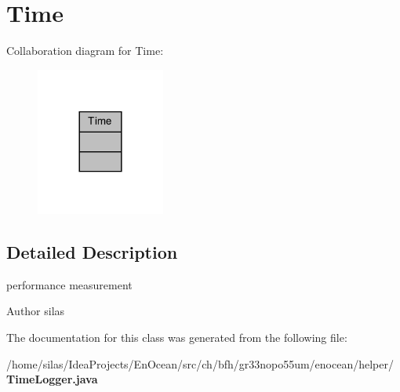 \section{Time}
\label{classTime}


Collaboration diagram for Time\+:\nopagebreak
\begin{figure}[H]
\begin{center}
\leavevmode
\includegraphics[width=120pt]{dd/d59/classTime__coll__graph}
\end{center}
\end{figure}


\subsection{Detailed Description}
performance measurement

\begin{DoxyAuthor}{Author}
silas 
\end{DoxyAuthor}


The documentation for this class was generated from the following file\+:\begin{DoxyCompactItemize}
\item 
/home/silas/\+Idea\+Projects/\+En\+Ocean/src/ch/bfh/gr33nopo55um/enocean/helper/{\bf Time\+Logger.\+java}\end{DoxyCompactItemize}
